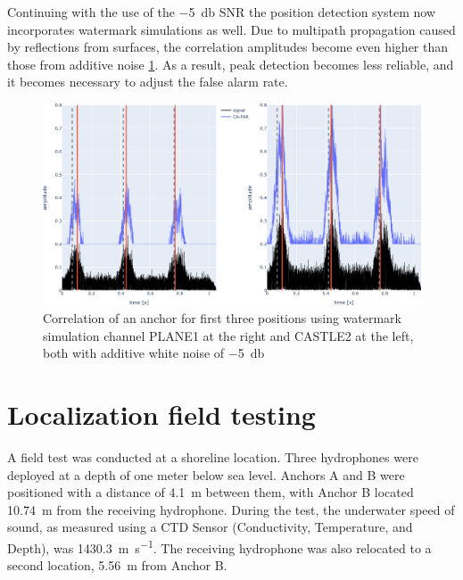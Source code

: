 Continuing with the use of the \SI{-5}{\decibel} SNR the position detection system now incorporates watermark simulations as well. Due to multipath propagation caused by reflections from surfaces, the correlation amplitudes become even higher than those from additive noise \ref{fig:3dvslines2}. As a result, peak detection becomes less reliable, and it becomes necessary to adjust the false alarm rate.
\begin{figure}
	\includegraphics[width=\linewidth]{images/simulation/d10plane1vscastle2lines} 
	\caption{Correlation of an anchor for first three positions using watermark simulation channel PLANE1 at the right and CASTLE2 at the left, both with additive white noise of \SI{-5}{\decibel}}
	\label{fig:3dvslines2}
\end{figure}
\newpage
\section{Localization field testing}
A field test was conducted at a shoreline location. Three hydrophones were deployed at a depth of one meter below sea level. Anchors A and B were positioned with a distance of \SI{4.1}{\meter} between them, with Anchor B located \SI{10.74}{\meter} from the receiving hydrophone. During the test, the underwater speed of sound, as measured using a CTD Sensor (Conductivity, Temperature, and Depth), was \SI{1430.3}{\meter\per\second}. The receiving hydrophone was also relocated to a second location, \SI{5.56}{\meter} from Anchor B.

